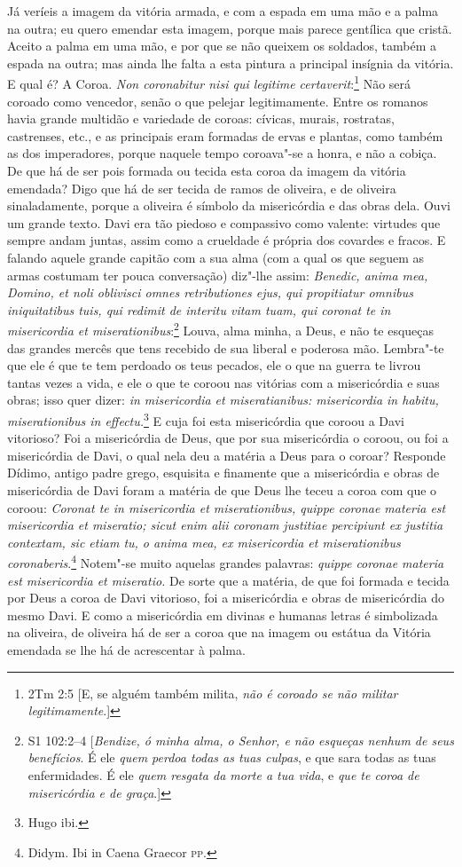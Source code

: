 Já veríeis a imagem da vitória armada, e com a espada em uma mão e a
palma na outra; eu quero emendar esta imagem, porque mais parece
gentílica que cristã.
Aceito a palma em uma mão, e por que se não queixem os soldados, também
a espada na outra; mas ainda lhe falta a esta pintura a principal
insígnia da vitória. E qual é? A Coroa. \emph{Non coronabitur nisi qui
legitime certaverit}:\footnote{2Tm 2:5 [E, se alguém também milita, \textit{não é coroado se não militar legitimamente}.]} Não será coroado como vencedor,
senão o que pelejar legitimamente. Entre os romanos havia grande
multidão e variedade de coroas: cívicas, murais, rostratas, castrenses,
etc., e as principais eram formadas de ervas e plantas, como também as
dos imperadores, porque naquele tempo coroava"-se a honra, e não a
cobiça. De que há de ser pois formada ou tecida esta coroa da imagem da
vitória emendada? Digo que há de ser tecida de ramos de oliveira, e de
oliveira sinaladamente, porque a oliveira é símbolo da misericórdia e
das obras dela. Ouvi um grande texto. Davi era tão piedoso e compassivo
como valente: virtudes que sempre andam juntas, assim como a crueldade é
própria dos covardes e fracos. E falando aquele grande capitão com a sua
alma (com a qual os que seguem as armas costumam ter pouca conversação)
diz"-lhe assim: \emph{Benedic, anima mea, Domino, et noli oblivisci
omnes retributiones ejus, qui propitiatur omnibus iniquitatibus tuis,
qui redimit de interitu vitam tuam, qui coronat te in misericordia et
miserationibus}:\footnote{S1 102:2--4 [\textit{Bendize, ó minha alma, o Senhor, e não esqueças nenhum de seus benefícios}. É ele \textit{quem perdoa todas as tuas culpas}, e que sara todas as tuas enfermidades. É ele \textit{quem resgata da morte a tua vida}, e \textit{que te coroa de misericórdia e de graça}.]}
Louva, alma minha, a Deus, e não te esqueças das grandes mercês que tens
recebido de sua liberal e poderosa mão. Lembra"-te que ele é que te tem
perdoado os teus pecados, ele o que na guerra te livrou tantas vezes a
vida, e ele o que te coroou nas vitórias com a misericórdia e suas
obras; isso quer dizer: \emph{in misericordia et miseratianibus:
misericordia in habitu, miserationibus in effectu.}\footnote{Hugo ibi.} E cuja foi esta
misericórdia que coroou a Davi vitorioso? Foi a misericórdia de Deus,
que por sua misericórdia o coroou, ou foi a misericórdia de Davi, o qual
nela deu a matéria a Deus para o coroar? Responde Dídimo, antigo padre
grego, esquisita e finamente que a misericórdia e obras de misericórdia
de Davi foram a matéria de que Deus lhe teceu a coroa com que o coroou:
\emph{Coronat te in misericordia et miserationibus, quippe coronae
materia est misericordia et miseratio; sicut enim alii coronam justitiae
percipiunt ex justitia contextam, sic etiam tu, o anima mea, ex
misericordia et miserationibus coronaberis}.\footnote{Didym. Ibi in Caena Graecor \textsc{pp}.} Notem"-se muito
aquelas grandes palavras: \emph{quippe coronae materia est misericordia
et miseratio.} De sorte que a matéria, de que foi formada e tecida por
Deus a coroa de Davi vitorioso, foi a misericórdia e obras de
misericórdia do mesmo Davi. E como a misericórdia em divinas e humanas
letras é simbolizada na oliveira, de oliveira há de ser a coroa que na
imagem ou estátua da Vitória emendada se lhe há de acrescentar à palma.

